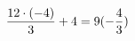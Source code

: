 \documentclass[preview]{standalone}
\begin{document}
\begin{align*}
\special{dvisvgm:raw <g id='unique000'>}\frac{12 \cdot (-4)}{3} + 4 = 9(- \frac{4}{3})\special{dvisvgm:raw </g>}
\end{align*}
\end{document}
